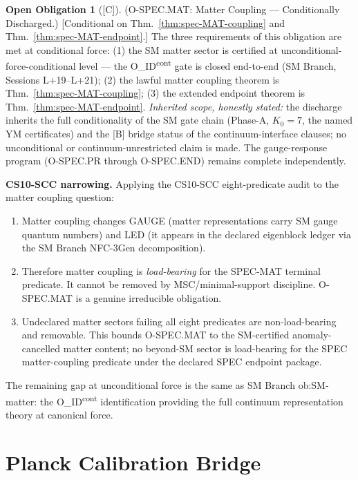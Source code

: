\documentclass[12pt,oneside]{amsbook}
\theoremstyle{plain}
\theoremstyle{definition}
\newtheorem{obligation}[theorem]{Open Obligation}
\theoremstyle{remark}
\newcommand{\status}[1]{\textup{[#1]}}
\begin{document}
\begin{obligation}[\status{C}]\label{ob:spec-MAT-open}
\textup{(O-SPEC.MAT: Matter Coupling --- Conditionally
Discharged.)}
\textup{[Conditional on Thm.~\ref{thm:spec-MAT-coupling} and
Thm.~\ref{thm:spec-MAT-endpoint}.]}
The three requirements of this obligation are met at conditional
force: (1) the SM matter sector is certified at
unconditional-force-conditional level --- the
O\_ID\textsuperscript{cont} gate is closed end-to-end
(SM Branch, Sessions L+19--L+21); (2) the lawful matter coupling
theorem is Thm.~\ref{thm:spec-MAT-coupling}; (3) the extended
endpoint theorem is Thm.~\ref{thm:spec-MAT-endpoint}.
\emph{Inherited scope, honestly stated:} the discharge inherits
the full conditionality of the SM gate chain (Phase-A, $K_0=7$,
the named YM certificates) and the [B] bridge status of the
continuum-interface clauses; no unconditional or
continuum-unrestricted claim is made.  The gauge-response program
(O-SPEC.PR through O-SPEC.END) remains complete independently.

\textbf{CS10-SCC narrowing.}
Applying the CS10-SCC eight-predicate audit to the matter coupling
question:
\begin{enumerate}[label=\textup{(\arabic*)}]
 \item Matter coupling changes GAUGE (matter representations carry
 SM gauge quantum numbers) and LED (it appears in the
 declared eigenblock ledger via the SM Branch NFC-3Gen decomposition).
 \item Therefore matter coupling is \emph{load-bearing} for the
 SPEC-MAT terminal predicate. It cannot be removed by
 MSC/minimal-support discipline. O-SPEC.MAT is a genuine
 irreducible obligation.
 \item Undeclared matter sectors failing all eight predicates are
 non-load-bearing and removable. This bounds O-SPEC.MAT to the
 SM-certified anomaly-cancelled matter content; no beyond-SM
 sector is load-bearing for the SPEC matter-coupling predicate
 under the declared SPEC endpoint package.
\end{enumerate}
The remaining gap at unconditional force is the same as SM Branch
ob:SM-matter: the O\_ID\textsuperscript{cont} identification providing
the full continuum representation theory at canonical force.
\end{obligation}

\section{Planck Calibration Bridge}\label{sec:spec-planck}
\end{document}
